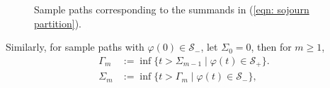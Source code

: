\begin{figure}
    \caption{\label{fig: sample paths} Sample paths corresponding to the summands in (\ref{eqn: sojourn partition}).}
\end{figure}
Similarly, for sample paths with \(\varphi(0)\in\mathcal S_-\), let \(\Sigma_0=0\), then for \(m\geq 1\), 
\begin{align}
	\Gamma_m &:=\inf\{t > \Sigma_{m-1} \mid \varphi(t)\in\mathcal S_+\}.
	\\\Sigma_m &:=\inf\{t > \Gamma_{m} \mid \varphi(t)\in\mathcal S_-\}, 
\end{align}

